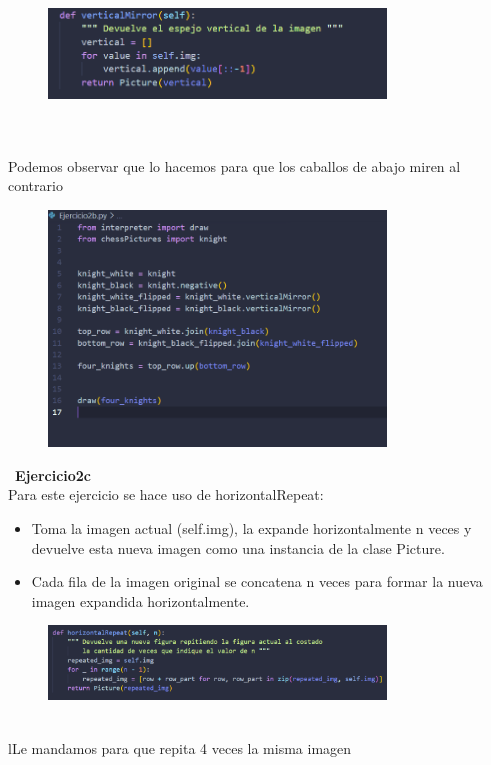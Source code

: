 \documentclass{article}
\begin{document}
     \begin{figure}[H]
		          \centering
		          \includegraphics[width=0.8\textwidth,keepaspectratio]                       {img/picVerm.png}
    \end{figure}
\\
\\Podemos observar que lo hacemos para que los caballos de abajo miren al contrario
    \begin{figure}[H]
		          \centering
		          \includegraphics[width=0.8\textwidth,keepaspectratio]                       {img/Ejb.png}
    \end{figure}
\
\textbf{Ejercicio2c }
\\Para este ejercicio se hace uso de horizontalRepeat:
\begin{itemize}
    \item Toma la imagen actual (self.img), la expande horizontalmente n veces y devuelve esta nueva imagen como una instancia de la clase Picture.
    \item Cada fila de la imagen original se concatena n veces para formar la nueva imagen expandida horizontalmente.
\end{itemize}

    \begin{figure}[H]
		          \centering
		          \includegraphics[width=0.8\textwidth,keepaspectratio]                       {img/picHor.png}
    \end{figure}
\\lLe mandamos para que repita 4 veces la misma imagen
\end{document}
